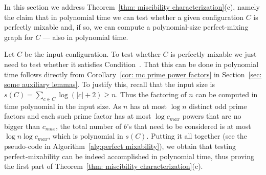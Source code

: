 

%

	
	In this section we address Theorem~\ref{thm: miscibility characterization}(c), namely
	the claim that in polynomial time we can test 
	whether a given configuration $C$ is perfectly mixable and, if so, we can
	compute a polynomial-size perfect-mixing graph for $C$ --- also in polynomial time.
	
	Let $C$ be the input configuration. To test whether $C$ is perfectly mixable we just
	need to test whether it satisfies Condition~{\MixCond}.
	That this can be done in polynomial
	time follows directly from Corollary~\ref{cor: mc prime power factors} 
	in Section~\ref{sec: some auxiliary lemmas}.
	To justify this, recall that
	the input size is $s(C) = \sum_{c\in C} \log(|c|+2)\ge n$.
	Thus the factoring of $n$ can be computed in time polynomial in the input size.
	As $n$ has at most $\log n$ distinct odd prime factors and
	each such prime factor has at most $\log{c_{max}}$ powers that are no bigger than $c_{max}$,
	the total number of $b$'s that need to be considered 
	is at most $\log{n}\log{c_{max}}$, which is polynomial in $s(C)$.
	Putting it all together (see the pseudo-code in Algorithm~\ref{alg:perfect mixability}), 
	we obtain that testing perfect-mixability can be indeed accomplished in polynomial time, 
	thus proving the first part of Theorem~\ref{thm: miscibility characterization}(c).
	
	
	\begin{algorithm}[H]
		\caption{PerfectMixabilityTesting($C$)}
		\label{alg:perfect mixability}
		\begin{algorithmic}[1]
			\EndIf
			\EndFor
		\end{algorithmic}
	\end{algorithm}


